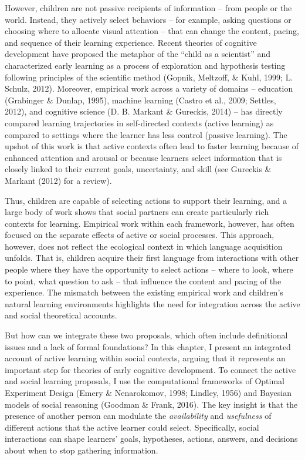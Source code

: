 \documentclass[oneside]{report}
\begin{document}
However, children are not passive recipients of information -- from
people or the world. Instead, they actively select behaviors -- for
example, asking questions or choosing where to allocate visual attention
-- that can change the content, pacing, and sequence of their learning
experience. Recent theories of cognitive development have proposed the
metaphor of the ``child as a scientist'' and characterized early
learning as a process of exploration and hypothesis testing following
principles of the scientific method (Gopnik, Meltzoff, \& Kuhl, 1999; L.
Schulz, 2012). Moreover, empirical work across a variety of domains --
education (Grabinger \& Dunlap, 1995), machine learning (Castro et al.,
2009; Settles, 2012), and cognitive science (D. B. Markant \& Gureckis,
2014) -- has directly compared learning trajectories in self-directed
contexts (active learning) as compared to settings where the learner has
less control (passive learning). The upshot of this work is that active
contexts often lead to faster learning because of enhanced attention and
arousal or because learners select information that is closely linked to
their current goals, uncertainty, and skill (see Gureckis \& Markant
(2012) for a review).

Thus, children are capable of selecting actions to support their
learning, and a large body of work shows that social partners can create
particularly rich contexts for learning. Empirical work within each
framework, however, has often focused on the separate effects of active
or social processes. This approach, however, does not reflect the
ecological context in which language acquisition unfolds. That is,
children acquire their first language from interactions with other
people where they have the opportunity to select actions -- where to
look, where to point, what question to ask -- that influence the content
and pacing of the experience. The mismatch between the existing
empirical work and children's natural learning environments highlights
the need for integration across the active and social theoretical
accounts.

But how can we integrate these two proposals, which often include
definitional issues and a lack of formal foundations? In this chapter, I
present an integrated account of active learning within social contexts,
arguing that it represents an important step for theories of early
cognitive development. To connect the active and social learning
proposals, I use the computational frameworks of Optimal Experiment
Design (Emery \& Nenarokomov, 1998; Lindley, 1956) and Bayesian models
of social reasoning (Goodman \& Frank, 2016). The key insight is that
the presence of another person can modulate the \emph{availability} and
\emph{usefulness} of different actions that the active learner could
select. Specifically, social interactions can shape learners' goals,
hypotheses, actions, answers, and decisions about when to stop gathering
information.
\end{document}
